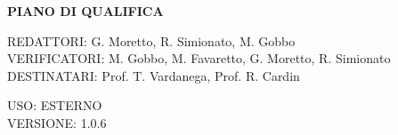 \documentclass[5pt]{article}
\begin{document}
	\vspace{24pt}
	
	\begin{center}
		\textbf{\LARGE PIANO DI QUALIFICA}
	\end{center}
	
	\vspace{13pt}
	
	\begin{flushleft}
		\begin{spacing}{1.5}
			REDATTORI: G. Moretto, R. Simionato, M. Gobbo\\%
			VERIFICATORI: M. Gobbo, M. Favaretto, G. Moretto, R. Simionato\\
			\vspace{7pt}
			DESTINATARI: Prof. T. Vardanega, Prof. R. Cardin\\%
		\end{spacing}
	\end{flushleft}
	
	\begin{flushright}
		\begin{spacing}{1}
			USO: ESTERNO\\
			VERSIONE: 1.0.6\\
		\end{spacing}
	\end{flushright}
	
	
	\restoregeometry
	
	\pagebreak
	
\end{document}
